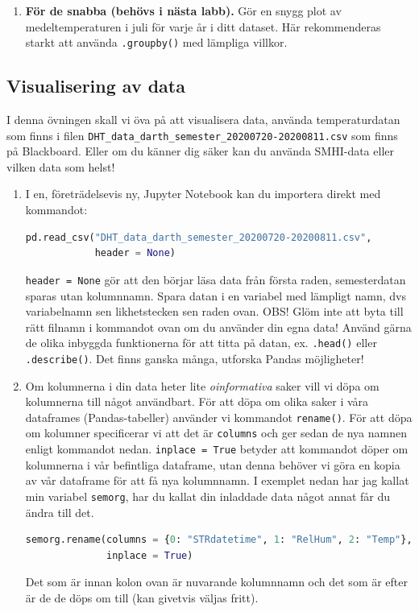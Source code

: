 \documentclass{article}
\begin{document}
\begin{enumerate}
    \item \textbf{För de snabba (behövs i nästa labb).} Gör en snygg plot av medeltemperaturen i juli för varje år i ditt dataset. Här rekommenderas starkt att använda \verb+.groupby()+ med lämpliga villkor. 
\end{enumerate}

\subsection{Visualisering av data}
I denna övningen skall vi öva på att visualisera data, använda temperaturdatan som finns i filen \verb+DHT_data_darth_semester_20200720-20200811.csv+ som finns på Blackboard. Eller om du känner dig säker kan du använda SMHI-data eller vilken data som helst!
\begin{enumerate}
\item I en, företrädelsevis ny, Jupyter Notebook kan du  importera direkt med kommandot:
\begin{lstlisting}[language=Python]
pd.read_csv("DHT_data_darth_semester_20200720-20200811.csv", 
            header = None)
\end{lstlisting}
\verb+header = None+ gör att den börjar läsa data från första raden, semesterdatan sparas utan kolumnnamn. Spara datan i en variabel med lämpligt namn, dvs variabelnamn sen likhetstecken sen raden ovan. OBS! Glöm inte att byta till rätt filnamn i kommandot ovan om du använder din egna data! Använd gärna de olika inbyggda funktionerna för att titta på datan, ex. \verb+.head()+ eller \verb+.describe()+. Det finns ganska många, utforska Pandas möjligheter!
\item Om kolumnerna i din data heter lite \emph{oinformativa} saker vill vi döpa om kolumnerna till något användbart. För att döpa om olika saker i våra dataframes (Pandas-tabeller) använder vi kommandot \verb+rename()+. För att döpa om kolumner specificerar vi att det är \verb+columns+ och ger sedan de nya namnen enligt kommandot nedan. \verb+inplace = True+ betyder att kommandot döper om kolumnerna i vår befintliga dataframe, utan denna behöver vi göra en kopia av vår dataframe för att få nya kolumnnamn. I exemplet nedan har jag kallat min variabel \verb+semorg+, har du kallat din inladdade data något annat får du ändra till det.
\begin{lstlisting}[language=Python]
semorg.rename(columns = {0: "STRdatetime", 1: "RelHum", 2: "Temp"}, 
              inplace = True)
\end{lstlisting}
Det som är innan kolon ovan är nuvarande kolumnnamn och det som är efter är de de döps om till (kan givetvis väljas fritt).

\end{enumerate}
\end{document}
